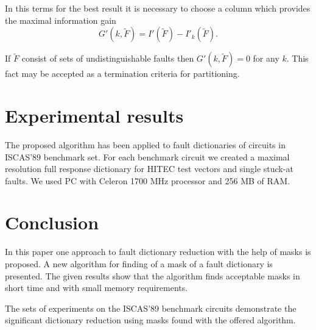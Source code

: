 \documentclass{article}
\begin{document}
In this terms for the best result it is necessary to choose a
column which provides the maximal information gain
\begin{equation}\label{eq:06}
    G'(k,\widetilde F)=I'(\widetilde F)-I'_k(\widetilde F).
\end{equation}

If $\widetilde F$ consist of sets of undistinguishable faults then
$G'(k,\widetilde F)=0$ for any $k$. This fact may be accepted as a
termination criteria for partitioning.



\section{Experimental results}
The proposed algorithm  has been applied to fault dictionaries of
circuits in ISCAS'89 benchmark set. For each benchmark circuit we
created a maximal resolution full response dictionary for HITEC
test vectors \cite{HITEC} and single stuck-at faults. We used PC
with Celeron 1700 MHz processor and 256 MB of RAM.



\section{Conclusion}

In this paper one approach to fault dictionary reduction with the
help of masks is proposed. A new algorithm for finding of a mask
of a fault dictionary is presented. The given results show that
the algorithm finds acceptable masks in short time and with small
memory requirements.

The sets of experiments on the ISCAS'89 benchmark circuits
demonstrate the significant dictionary reduction using masks found
with the offered algorithm.



\end{document}
